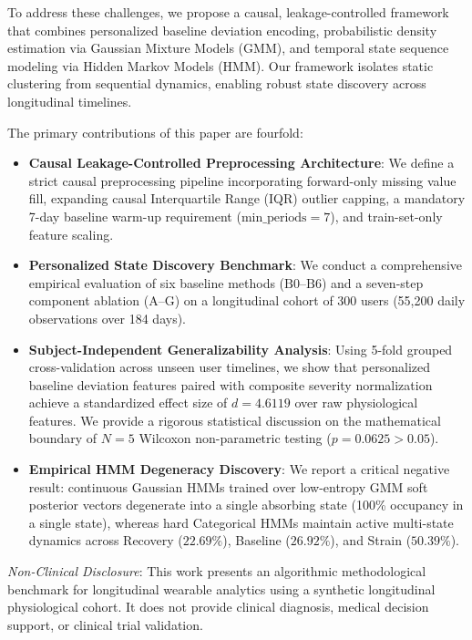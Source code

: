 \documentclass[conference]{IEEEtran}
\begin{document}
To address these challenges, we propose a causal, leakage-controlled framework that combines personalized baseline deviation encoding, probabilistic density estimation via Gaussian Mixture Models (GMM), and temporal state sequence modeling via Hidden Markov Models (HMM). Our framework isolates static clustering from sequential dynamics, enabling robust state discovery across longitudinal timelines.

The primary contributions of this paper are fourfold:
\begin{itemize}
    \item \textbf{Causal Leakage-Controlled Preprocessing Architecture}: We define a strict causal preprocessing pipeline incorporating forward-only missing value fill, expanding causal Interquartile Range (IQR) outlier capping, a mandatory 7-day baseline warm-up requirement ($\text{min\_periods}=7$), and train-set-only feature scaling.
    \item \textbf{Personalized State Discovery Benchmark}: We conduct a comprehensive empirical evaluation of six baseline methods ($\text{B0}$–$\text{B6}$) and a seven-step component ablation ($\text{A}$–$\text{G}$) on a longitudinal cohort of 300 users (55,200 daily observations over 184 days).
    \item \textbf{Subject-Independent Generalizability Analysis}: Using 5-fold grouped cross-validation across unseen user timelines, we show that personalized baseline deviation features paired with composite severity normalization achieve a standardized effect size of $d = 4.6119$ over raw physiological features. We provide a rigorous statistical discussion on the mathematical boundary of $N=5$ Wilcoxon non-parametric testing ($p = 0.0625 > 0.05$).
    \item \textbf{Empirical HMM Degeneracy Discovery}: We report a critical negative result: continuous Gaussian HMMs trained over low-entropy GMM soft posterior vectors degenerate into a single absorbing state (100\% occupancy in a single state), whereas hard Categorical HMMs maintain active multi-state dynamics across Recovery ($22.69\%$), Baseline ($26.92\%$), and Strain ($50.39\%$).
\end{itemize}

\textit{Non-Clinical Disclosure}: This work presents an algorithmic methodological benchmark for longitudinal wearable analytics using a synthetic longitudinal physiological cohort. It does not provide clinical diagnosis, medical decision support, or clinical trial validation.
\end{document}
